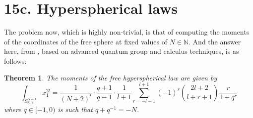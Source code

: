 \documentclass[12pt]{amsbook}
\newtheorem{theorem}{Theorem}[chapter]
\begin{document}
\section*{15c. Hyperspherical laws}

The problem now, which is highly non-trivial, is that of computing the moments of the coordinates of the free sphere at fixed values of $N\in\mathbb N$. And the answer here, from \cite{bcz}, based on advanced quantum group and calculus techniques, is as follows:


\begin{theorem}
The moments of the free hyperspherical law are given by
$$\int_{S^{N-1}_{\mathbb R,+}}x_1^{2l}=\frac{1}{(N+2)^l}\cdot\frac{q+1}{q-1}\cdot\frac{1}{l+1}\sum_{r=-l-1}^{l+1}(-1)^r\binom{2l+2}{l+r+1}\frac{r}{1+q^r}$$
where $q\in [-1,0)$ is such that $q+q^{-1}=-N$.
\end{theorem}
\end{document}
